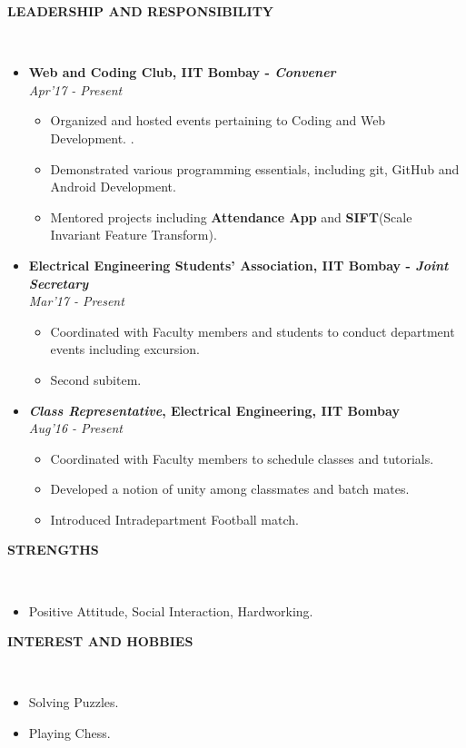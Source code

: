 \documentclass[a4paper,10pt]{article}
\newcommand{\isep}{-2 pt}
\newcommand{\lsep}{-0.5cm}
\newcommand{\resheading}[1]{{\small \colorbox{mygrey}{\begin{minipage}{0.975\textwidth}{\textbf{#1 \vphantom{p\^{E}}}}\end{minipage}}}}
\begin{document}
\resheading{\textbf{LEADERSHIP AND RESPONSIBILITY} }\\[\lsep]
\begin{itemize}
\item \textbf{Web and Coding Club, IIT Bombay - \emph{Convener} 
}  \\
 \emph{Apr'17 - Present} \\[-0.6cm]
	\begin{itemize}\itemsep \isep
	\item Organized and hosted events pertaining to Coding and Web Development.
.
	\item Demonstrated various programming essentials, including git, GitHub and Android Development.

	\item Mentored projects including \textbf{Attendance App} and \textbf{SIFT}(Scale Invariant Feature Transform).

	\end{itemize}

\item \textbf{Electrical Engineering Students' Association, IIT Bombay - \emph{Joint Secretary}
}  \\
 \emph{ Mar'17 - Present} \\[-0.6cm]
	\begin{itemize}\itemsep \isep
	\item Coordinated with Faculty members and students to conduct department events including excursion.
	\item Second subitem.
	\end{itemize}

\item \textbf{\emph{Class Representative}, Electrical Engineering, IIT Bombay
}  \\
 \emph{ Aug'16 - Present} \\[-0.6cm]
	\begin{itemize}\itemsep \isep
	\item Coordinated with Faculty members to schedule classes and tutorials.
	\item Developed a notion of unity among classmates and batch mates.
	\item Introduced Intradepartment Football match.
	\end{itemize}
\end{itemize}

\resheading{\textbf{STRENGTHS} }\\[\lsep]
\begin{itemize}
\item \noindent Positive Attitude, Social Interaction, Hardworking.
\end{itemize}

\resheading{\textbf{INTEREST AND HOBBIES} }\\[\lsep]
\begin{itemize}
\item \noindent Solving Puzzles.
\item \noindent Playing Chess.

\end{itemize}
\end{document}
